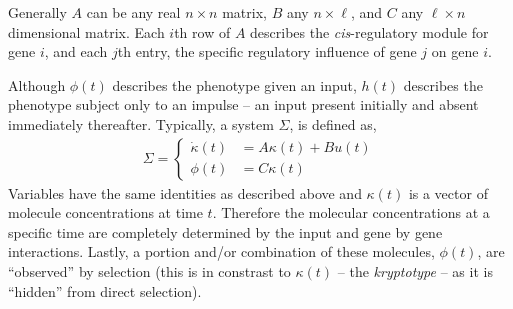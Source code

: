\documentclass[9 pt]{article}
\newcommand{\1}{\mathbbm{1}}
\begin{document}
  Generally $A$ can be any real $n \times n$ matrix, $B$ any $n \times \ell$, and $C$ any $\ell \times n$ dimensional matrix. Each $i$th row of $A$ describes the \emph{cis}-regulatory module for gene $i$, and each $j$th entry, the specific regulatory influence of gene $j$ on gene $i$. 

  Although $\phi(t)$ describes the phenotype given an input, $h(t)$ describes the phenotype subject only to an impulse -- an input present initially and absent immediately thereafter. Typically, a system $\Sigma$, is defined as,
  \begin{align}
    \Sigma = \left\{ \begin{array}{ll} \dot{\kappa}(t) &= A \kappa(t) + B u(t) \\ \phi(t) &= C \kappa(t) \end{array} \right.
  \end{align}
  Variables have the same identities as described above and $\kappa(t)$ is a vector of molecule concentrations at time $t$. Therefore the molecular concentrations at a specific time are completely determined by the input and gene by gene interactions. Lastly, a portion and/or combination of these molecules, $\phi(t)$, are ``observed'' by selection (this is in constrast to $\kappa(t)$ -- the \emph{kryptotype} -- as it is ``hidden'' from direct selection).
\end{document}
